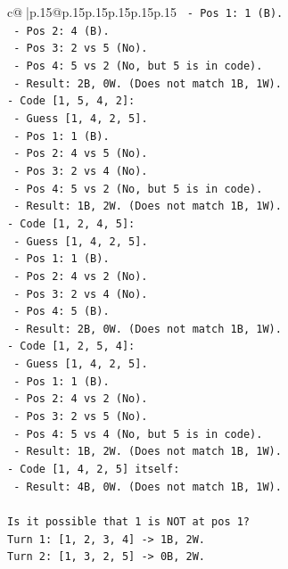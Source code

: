 \documentclass{article}
\begin{document}
{\begin{supertabular}{c@{$\;$}|p{.15\linewidth}@{}p{.15\linewidth}p{.15\linewidth}p{.15\linewidth}p{.15\linewidth}p{.15\linewidth}}
{{{\texttt{  {-} Pos 1: 1 (B).} \\
\texttt{  {-} Pos 2: 4 (B).} \\
\texttt{  {-} Pos 3: 2 vs 5 (No).} \\
\texttt{  {-} Pos 4: 5 vs 2 (No, but 5 is in code).} \\
\texttt{  {-} Result: 2B, 0W. (Does not match 1B, 1W).} \\
\texttt{{-} Code {[}1, 5, 4, 2{]}:} \\
\texttt{  {-} Guess {[}1, 4, 2, 5{]}.} \\
\texttt{  {-} Pos 1: 1 (B).} \\
\texttt{  {-} Pos 2: 4 vs 5 (No).} \\
\texttt{  {-} Pos 3: 2 vs 4 (No).} \\
\texttt{  {-} Pos 4: 5 vs 2 (No, but 5 is in code).} \\
\texttt{  {-} Result: 1B, 2W. (Does not match 1B, 1W).} \\
\texttt{{-} Code {[}1, 2, 4, 5{]}:} \\
\texttt{  {-} Guess {[}1, 4, 2, 5{]}.} \\
\texttt{  {-} Pos 1: 1 (B).} \\
\texttt{  {-} Pos 2: 4 vs 2 (No).} \\
\texttt{  {-} Pos 3: 2 vs 4 (No).} \\
\texttt{  {-} Pos 4: 5 (B).} \\
\texttt{  {-} Result: 2B, 0W. (Does not match 1B, 1W).} \\
\texttt{{-} Code {[}1, 2, 5, 4{]}:} \\
\texttt{  {-} Guess {[}1, 4, 2, 5{]}.} \\
\texttt{  {-} Pos 1: 1 (B).} \\
\texttt{  {-} Pos 2: 4 vs 2 (No).} \\
\texttt{  {-} Pos 3: 2 vs 5 (No).} \\
\texttt{  {-} Pos 4: 5 vs 4 (No, but 5 is in code).} \\
\texttt{  {-} Result: 1B, 2W. (Does not match 1B, 1W).} \\
\texttt{{-} Code {[}1, 4, 2, 5{]} itself:} \\
\texttt{  {-} Result: 4B, 0W. (Does not match 1B, 1W).} \\
\\ 
\texttt{Is it possible that 1 is NOT at pos 1?} \\
\texttt{Turn 1: {[}1, 2, 3, 4{]} {-}> 1B, 2W.} \\
\texttt{Turn 2: {[}1, 3, 2, 5{]} {-}> 0B, 2W.} \\
}}}
\end{supertabular}}
\end{document}
